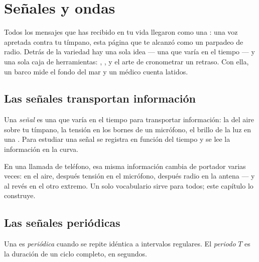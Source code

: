 \chapter{Señales y ondas}\label{ch:g10:signals-and-waves}

Todos los mensajes que has recibido en tu vida llegaron como una :
una voz apretada contra tu tímpano, esta página que te alcanzó como un
parpadeo de radio. Detrás de la variedad hay una sola idea --- una
 que varía en el tiempo --- y una sola caja de
herramientas: , ,  y el arte de cronometrar un
retraso. Con ella, un barco mide el fondo del mar y un médico cuenta
latidos.

\section{Las señales transportan información}

\begin{definition}[Señal]\label{def:g10:signals-and-waves:signal}
Una \emph{señal} es una  que varía en el
tiempo para transportar información: la  del aire sobre tu
tímpano, la tensión en los bornes de un micrófono, el brillo de la luz
en una . Para estudiar una señal se registra en función del
tiempo y se lee la información en la curva.
\end{definition}

En una llamada de teléfono, esa misma información cambia de portador
varias veces:  en el aire, después tensión en el micrófono,
después radio en la antena --- y al revés en el otro extremo. Un solo
vocabulario sirve para todos; este capítulo lo construye.

\section{Las señales periódicas}

\begin{definition}\label{def:g10:signals-and-waves:period}
Una  es \emph{periódica} cuando se repite
idéntica a intervalos regulares. El \emph{periodo} $T$ es
la duración de un ciclo completo, en segundos.
\end{definition}

